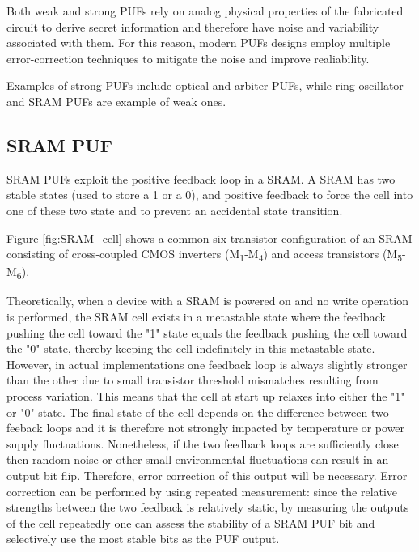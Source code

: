 Both weak and strong PUFs rely on analog physical properties of the fabricated circuit to derive secret information and therefore have noise and variability associated with them. For this reason, modern PUFs designs employ multiple error-correction techniques to mitigate the noise and improve realiability.

Examples of strong PUFs include optical and arbiter PUFs, while ring-oscillator and SRAM PUFs are example of weak ones.  \cite{PUF_IEEE_Herder}

\subsection{SRAM PUF}
SRAM PUFs exploit the positive feedback loop in a SRAM. A SRAM has two stable states (used to store a 1 or a 0), and positive feedback to force the cell into one of these two state and to prevent an accidental state transition. 

Figure \ref{fig:SRAM_cell} shows a common six-transistor configuration of an SRAM consisting of cross-coupled CMOS inverters (M\textsubscript{1}-M\textsubscript{4}) and access transistors (M\textsubscript{5}-M\textsubscript{6}).

Theoretically, when a device with a SRAM is powered on and no write operation is performed, the SRAM cell exists in a metastable state where the feedback pushing the cell toward the "1" state equals the feedback pushing the cell toward the "0" state, thereby keeping the cell indefinitely in this metastable state. However, in actual implementations one feedback loop is always slightly stronger than the other due to small transistor threshold mismatches resulting from process variation. This means that the cell at start up relaxes into either the "1" or "0" state. The final state of the cell depends on the difference between two feeback loops and it is therefore not strongly impacted by temperature or power supply fluctuations. Nonetheless, if the two feedback loops are sufficiently close then random noise or other small environmental fluctuations can result in an output bit flip. Therefore, error correction of this output will be necessary. Error correction can be performed by using repeated measurement: since the relative strengths between the two feedback is relatively static, by measuring the outputs of the cell repeatedly one can assess the stability of a SRAM PUF bit and selectively use the most stable bits as the PUF output.  \cite{PUF_IEEE_Herder}

